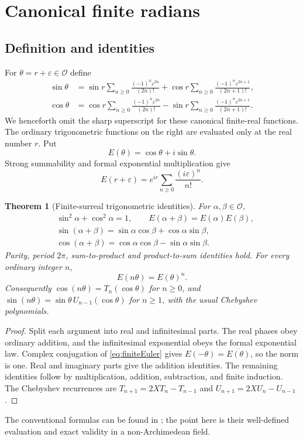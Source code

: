 \documentclass[11pt,letterpaper]{article}
\newtheorem{theorem}{Theorem}[section]
\theoremstyle{definition}
\theoremstyle{remark}
\newcommand{\OO}{\mathcal O}\newcommand{\mm}{\mathfrak m}
\numberwithin{equation}{section}
\begin{document}
\section{Canonical finite radians}\label{sec:radians}
\subsection{Definition and identities}
For $\theta=r+\varepsilon\in\OO$ define
\begin{align}
 \sin\theta&=\sin r\sum_{n\ge0}\frac{(-1)^n\varepsilon^{2n}}{(2n)!}
 +\cos r\sum_{n\ge0}\frac{(-1)^n\varepsilon^{2n+1}}{(2n+1)!},\label{eq:sinfinite}\\
 \cos\theta&=\cos r\sum_{n\ge0}\frac{(-1)^n\varepsilon^{2n}}{(2n)!}
 -\sin r\sum_{n\ge0}\frac{(-1)^n\varepsilon^{2n+1}}{(2n+1)!}.\label{eq:cosfinite}
\end{align}
We henceforth omit the sharp superscript for these canonical finite-real functions. The ordinary trigonometric functions on the right are evaluated only at the real number $r$. Put
\[
 E(\theta)=\cos\theta+i\sin\theta.
\]
Strong summability and formal exponential multiplication give
\begin{equation}\label{eq:finiteEuler}
 E(r+\varepsilon)=e^{ir}\sum_{n\ge0}\frac{(i\varepsilon)^n}{n!}.
\end{equation}

\begin{theorem}[Finite-surreal trigonometric identities]\label{thm:identities}
For $\alpha,\beta\in\OO$,
\begin{align*}
 &\sin^2\alpha+\cos^2\alpha=1,\qquad E(\alpha+\beta)=E(\alpha)E(\beta),\\
 &\sin(\alpha+\beta)=\sin\alpha\cos\beta+\cos\alpha\sin\beta,\\
 &\cos(\alpha+\beta)=\cos\alpha\cos\beta-\sin\alpha\sin\beta.
\end{align*}
Parity, period $2\pi$, sum-to-product and product-to-sum identities hold. For every ordinary integer $n$,
\[
 E(n\theta)=E(\theta)^n.
\]
Consequently $\cos(n\theta)=T_n(\cos\theta)$ for $n\ge0$, and
$\sin(n\theta)=\sin\theta\,U_{n-1}(\cos\theta)$ for $n\ge1$, with the usual Chebyshev polynomials.
\end{theorem}
\begin{proof}
Split each argument into real and infinitesimal parts. The real phases obey ordinary addition, and the infinitesimal exponential obeys the formal exponential law. Complex conjugation of \eqref{eq:finiteEuler} gives $E(-\theta)=\overline{E(\theta)}$, so the norm is one. Real and imaginary parts give the addition identities. The remaining identities follow by multiplication, addition, subtraction, and finite induction. The Chebyshev recurrences are $T_{n+1}=2XT_n-T_{n-1}$ and $U_{n+1}=2XU_n-U_{n-1}$.
\end{proof}
The conventional formulas can be found in \cite[\S4.21]{DLMF}; the point here is their well-defined evaluation and exact validity in a non-Archimedean field.
\end{document}
